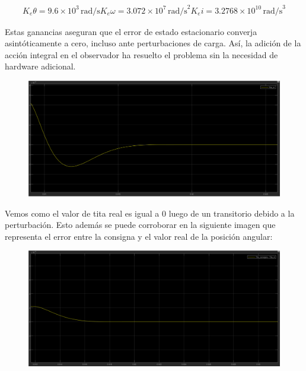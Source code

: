 \documentclass{article}
\begin{document}
\begin{align*}
    K_e\theta = 9.6 \times 10^3 \, \text{rad/s}
    K_e\omega = 3.072 \times 10^7 \, \text{rad/s}^2
    K_ei = 3.2768 \times 10^{10} \, \text{rad/s}^3
\end{align*}

Estas ganancias aseguran que el error de estado estacionario converja asintóticamente a cero, 
incluso ante perturbaciones de carga. Así, la adición de la acción integral en el observador ha 
resuelto el problema sin la necesidad de hardware adicional.

\begin{figure}[H]
    \centering
    \includegraphics[width=1\textwidth]{5.2.5.1.b.1.png}
\end{figure}

Vemos como el valor de tita real es igual a 0 luego de un transitorio debido a la perturbación. 
Esto además se puede corroborar en la siguiente imagen que representa el error entre la consigna y 
el valor real de la posición angular:

\begin{figure}[H]
    \centering
    \includegraphics[width=1\textwidth]{5.2.5.1.b.2.png}
\end{figure}

\end{document}
